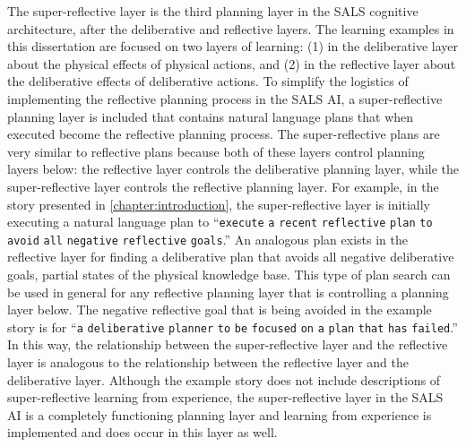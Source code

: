 The super-reflective layer is the third planning layer in the SALS
cognitive architecture, after the deliberative and reflective layers.
The learning examples in this dissertation are focused on two layers
of learning: (1) in the deliberative layer about the physical effects
of physical actions, and (2) in the reflective layer about the
deliberative effects of deliberative actions.  To simplify the
logistics of implementing the reflective planning process in the SALS
AI, a super-reflective planning layer is included that contains
natural language plans that when executed become the reflective
planning process.  The super-reflective plans are very similar to
reflective plans because both of these layers control planning layers
below: the reflective layer controls the deliberative planning layer,
while the super-reflective layer controls the reflective planning
layer.  For example, in the story presented in
{\mbox{\autoref{chapter:introduction}}}, the super-reflective layer is
initially executing a natural language plan to ``{\tt{execute}}
{\tt{a}} {\tt{recent}} {\tt{reflective}} {\tt{plan}} {\tt{to}}
{\tt{avoid}} {\tt{all}} {\tt{negative}} {\tt{reflective}}
{\tt{goals}}.''  An analogous plan exists in the reflective layer for
finding a deliberative plan that avoids all negative deliberative
goals, partial states of the physical knowledge base.  This type of
plan search can be used in general for any reflective planning layer
that is controlling a planning layer below.  The negative reflective
goal that is being avoided in the example story is for ``{\tt{a}}
{\tt{deliberative}} {\tt{planner}} {\tt{to}} {\tt{be}} {\tt{focused}}
{\tt{on}} {\tt{a}} {\tt{plan}} {\tt{that}} {\tt{has}} {\tt{failed}}.''
In this way, the relationship between the super-reflective layer and
the reflective layer is analogous to the relationship between the
reflective layer and the deliberative layer.  Although the example
story does not include descriptions of super-reflective learning from
experience, the super-reflective layer in the SALS AI is a completely
functioning planning layer and learning from experience is implemented
and does occur in this layer as well.

